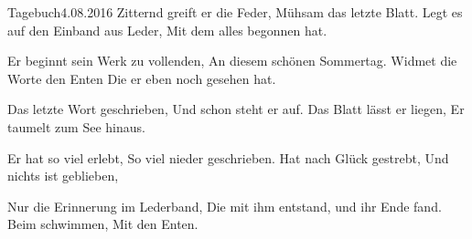 \begin{poem}{Tagebuch}{4.08.2016}
Zitternd greift er die Feder,
Mühsam das letzte Blatt.
Legt es auf den Einband aus Leder,
Mit dem alles begonnen hat.

Er beginnt sein Werk zu vollenden,
An diesem schönen Sommertag.
Widmet die Worte den Enten
Die er eben noch gesehen hat.

Das letzte Wort geschrieben,
Und schon steht er auf.
Das Blatt lässt er liegen,
Er taumelt zum See hinaus.

Er hat so viel erlebt,
So viel nieder geschrieben.
Hat nach Glück gestrebt,
Und nichts ist geblieben,

Nur die Erinnerung im Lederband,
Die mit ihm entstand,
und ihr Ende fand.
Beim schwimmen,
Mit den Enten.
\end{poem}